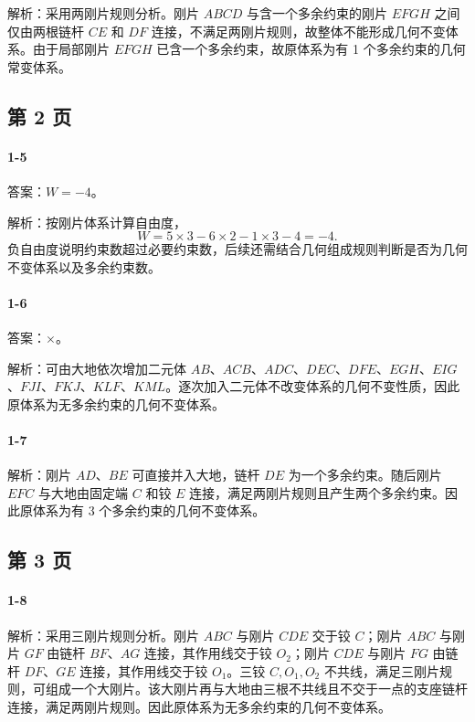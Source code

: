 解析：采用两刚片规则分析。刚片 $ABCD$ 与含一个多余约束的刚片 $EFGH$ 之间仅由两根链杆 $CE$ 和 $DF$ 连接，不满足两刚片规则，故整体不能形成几何不变体系。由于局部刚片 $EFGH$ 已含一个多余约束，故原体系为有 1 个多余约束的几何常变体系。

\subsection*{第 2 页}

\paragraph{1-5}
答案：$W=-4$。

解析：按刚片体系计算自由度，
\[
W=5\times 3-6\times 2-1\times 3-4=-4.
\]
负自由度说明约束数超过必要约束数，后续还需结合几何组成规则判断是否为几何不变体系以及多余约束数。

\paragraph{1-6}
答案：$\times$。

解析：可由大地依次增加二元体 $AB$、$ACB$、$ADC$、$DEC$、$DFE$、$EGH$、$EIG$、$FJI$、$FKJ$、$KLF$、$KML$。逐次加入二元体不改变体系的几何不变性质，因此原体系为无多余约束的几何不变体系。

\paragraph{1-7}
解析：刚片 $AD$、$BE$ 可直接并入大地，链杆 $DE$ 为一个多余约束。随后刚片 $EFC$ 与大地由固定端 $C$ 和铰 $E$ 连接，满足两刚片规则且产生两个多余约束。因此原体系为有 3 个多余约束的几何不变体系。

\subsection*{第 3 页}

\paragraph{1-8}
解析：采用三刚片规则分析。刚片 $ABC$ 与刚片 $CDE$ 交于铰 $C$；刚片 $ABC$ 与刚片 $GF$ 由链杆 $BF$、$AG$ 连接，其作用线交于铰 $O_2$；刚片 $CDE$ 与刚片 $FG$ 由链杆 $DF$、$GE$ 连接，其作用线交于铰 $O_1$。三铰 $C,O_1,O_2$ 不共线，满足三刚片规则，可组成一个大刚片。该大刚片再与大地由三根不共线且不交于一点的支座链杆连接，满足两刚片规则。因此原体系为无多余约束的几何不变体系。

